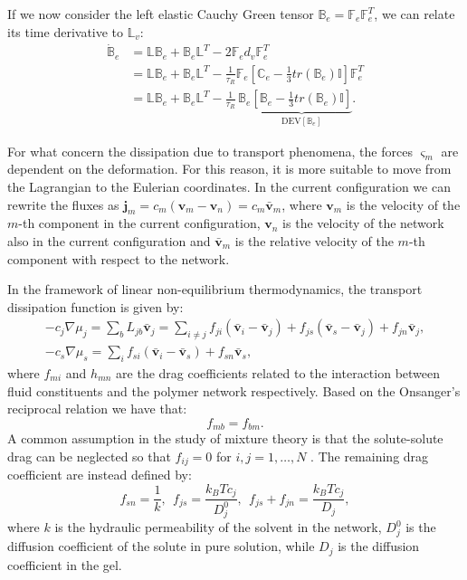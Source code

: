 \documentclass[runningheads]{llncs}
\newcommand{\F}{\ensuremath{\mathbb{F}}}
\newcommand{\LL}{\ensuremath{\mathbb{L}}}
\begin{document}
If we now consider the left elastic Cauchy Green tensor $\mathbb{B}_e=\F_e \F^T_e$, we can relate its time derivative to $\LL_v$:
\begin{equation}
\begin{aligned}
\dot{\mathbb{B}}_e &= \LL \mathbb{B}_e + \mathbb{B}_e \LL^T - 2 \F_e d_v \F_e^{T} \\
&= \LL\mathbb{B}_e + \mathbb{B}_e \LL^T - \frac{1}{\tau_R} \F_e\left[\mathbb{C}_e-\frac{1}{3}tr(\mathbb{B}_e)\mathbb{I}\right]\F_e^T\\
&= \LL\mathbb{B}_e + \mathbb{B}_e \LL^T - \frac{1}{\tau_R} \,\mathbb{B}_e\underbrace{\left[\mathbb{B}_e-\frac{1}{3}tr(\mathbb{B}_e)\mathbb{I}\right]}_{\text{DEV}[\mathbb{B}_e]}.
\end{aligned}
\end{equation}

For what concern the dissipation due to transport phenomena, the forces $\varsigma_m$ are dependent on the deformation. For this reason, it is more suitable to move from the Lagrangian to the Eulerian coordinates. In the current configuration we can rewrite the fluxes as $\mathbf{j}_m = c_m (\mathbf{v}_m-\mathbf{v}_n)= c_m \bar{\mathbf{v}}_{m}$, where $\mathbf{v}_m$ is the velocity of the $m$-th component in the current configuration, $\mathbf{v}_n$ is the velocity of the network also in the current configuration and  $\bar{\mathbf{v}}_{m}$ is the relative velocity of the $m$-th component with respect to the network. 

In the framework of linear non-equilibrium thermodynamics, the transport dissipation function is given by:
\begin{eqnarray}
-c_j \nabla \mu_j = \sum_b L_{jb} \bar{\mathbf{v}}_j= \sum_{i\neq j} f_{ji} \left(\bar{\mathbf{v}}_i-\bar{\mathbf{v}}_j\right) + f_{js} (\bar{\mathbf{v}}_s-\bar{\mathbf{v}}_j) + f_{jn} \bar{\mathbf{v}}_j,\label{drag1}\\
-c_s \nabla \mu_s = \sum_i f_{si} \left(\bar{\mathbf{v}}_i-\bar{\mathbf{v}}_s\right)+ f_{sn} \bar{\mathbf{v}}_s,
\end{eqnarray}
where $f_{mi}$ and $h_{mn}$ are the drag coefficients related to the interaction between fluid constituents and the polymer network respectively. Based on the Onsanger's reciprocal relation we have that:
\begin{equation}
f_{mb}=f_{bm}.
\end{equation}
A common assumption in the study of mixture theory is that the solute-solute drag can be neglected so that $f_{ij}=0$ for $i,j=1,\ldots,N$ \cite{ecm1,bookbiophys}. The remaining drag coefficient are instead defined by:
\begin{equation}
f_{sn} = \frac{1}{k}, \ \ f_{js}=\frac{k_BT c_j}{D^0_{j}},\ \  f_{js}+f_{jn}= \frac{k_BT c_j}{D_j}, \label{drag2}
\end{equation}
where $k$ is the hydraulic permeability of the solvent in the network, $D^0_j$ is the diffusion coefficient of the solute in pure solution, while $D_j$ is the diffusion coefficient in the gel.
\end{document}
